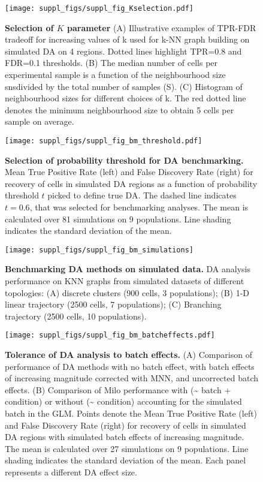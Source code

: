 \documentclass[
]{article}
\begin{document}
\begin{figure}
\centering
\texttt{[image: suppl\_figs/suppl\_fig\_Kselection.pdf]}
\caption{\label{fig:sup-fig-Kselection}\textbf{Selection of \(K\) parameter}
(A) Illustrative examples of TPR-FDR tradeoff for increasing values of k used for k-NN graph building on simulated DA on 4 regions. Dotted lines highlight TPR=0.8 and FDR=0.1 thresholds.
(B) The median number of cells per experimental sample is a function of the neighbourhood size snsdivided by the total number of samples (S). (C) Histogram of neighbourhood sizes for different choices of k. The red dotted line denotes the minimum neighbourhood size to obtain 5 cells per sample on average.}
\end{figure}







\begin{figure}
\centering
\texttt{[image: suppl\_figs/suppl\_fig\_bm\_threshold.pdf]}
\caption{\label{fig:sup-fig-bm-threshold}\textbf{Selection of probability threshold for DA benchmarking.} Mean True Positive Rate (left) and False Discovery Rate (right) for recovery of cells in simulated DA regions as a function of probability threshold \(t\) picked to define true DA. The dashed line indicates \(t = 0.6\), that was selected for benchmarking analyses. The mean is calculated over 81 simulations on 9 populations. Line shading indicates the standard deviation of the mean.}
\end{figure}



\begin{figure}[ht]
\texttt{[image: suppl\_figs/suppl\_fig\_bm\_simulations]} \caption{\textbf{Benchmarking DA methods on simulated data.} DA analysis performance on KNN graphs from simulated datasets of different topologies: (A) discrete clusters (900 cells, 3 populations); (B) 1-D linear trajectory (2500 cells, 7 populations); (C) Branching trajectory (2500 cells, 10 populations).}\label{fig:sup-fig-bm-simulations}
\end{figure}



\begin{figure}
\centering
\texttt{[image: suppl\_figs/suppl\_fig\_bm\_batcheffects.pdf]}
\caption{\label{fig:sup-fig-bm-batcheffects}\textbf{Tolerance of DA analysis to batch effects.} (A) Comparison of performance of DA methods with no batch effect, with batch effects of increasing magnitude corrected with MNN, and uncorrected batch effects. (B) Comparison of Milo performance with (\textasciitilde{} batch + condition) or without (\textasciitilde{} condition) accounting for the simulated batch in the GLM. Points denote the Mean True Positive Rate (left) and False Discovery Rate (right) for recovery of cells in simulated DA regions with simulated batch effects of increasing magnitude. The mean is calculated over 27 simulations on 9 populations. Line shading indicates the standard deviation of the mean. Each panel represents a different DA effect size.}
\end{figure}
\end{document}
